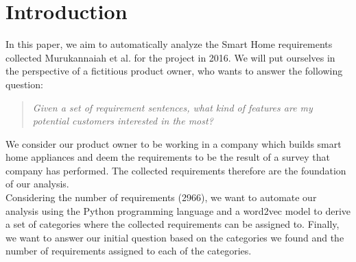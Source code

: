 \section{Introduction} %
\label{sec:introduction}
In this paper, we aim to automatically analyze the Smart Home requirements collected Murukannaiah et al. for the \crowdre{} project\cite{murukannaiah_toward_2017} in 2016. We will put ourselves in the perspective of a fictitious product owner, who wants to answer the following question:\\
\begin{quote}
\textit{Given a set of requirement sentences, what kind of features are my potential customers interested in the most?}
\end{quote}

We consider our product owner to be working in a company which builds smart home appliances and deem the \crowdre{} requirements to be the result of a survey that company has performed. The collected requirements therefore are the foundation of our analysis.\\
Considering the number of requirements (2966), we want to automate our analysis using the Python programming language and a word2vec model to derive a set of categories where the collected requirements can be assigned to. Finally, we want to answer our initial question based on the categories we found and the number of requirements assigned to each of the categories.
